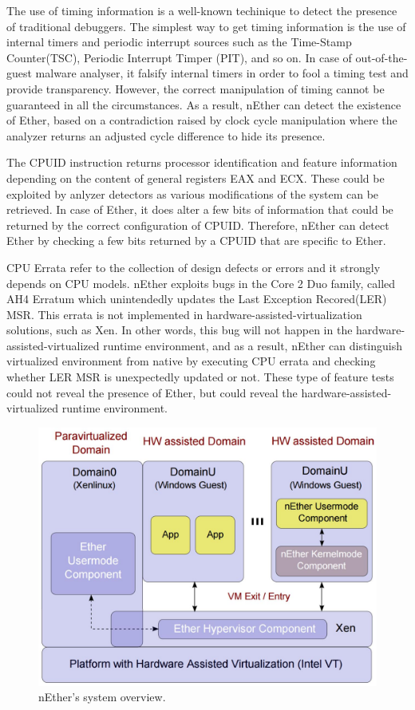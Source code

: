 The use of timing information is a well-known techinique to detect the presence 
of traditional debuggers. The simplest way to get timing information is 
the use of internal timers and periodic interrupt sources such as the Time-Stamp Counter(TSC), 
Periodic Interrupt Timper (PIT), and so on. In case of out-of-the-guest malware analyser, 
it falsify internal timers in order to fool a timing test and provide transparency. 
However, the correct manipulation of timing cannot be guaranteed in all the circumstances. 
As a result, nEther can detect the existence of Ether, based on a contradiction 
raised by clock cycle manipulation where the analyzer returns an adjusted cycle 
difference to hide its presence.

The CPUID instruction returns processor identification and feature information 
depending on the content of general registers EAX and ECX. These could be exploited 
by anlyzer detectors as various modifications of the system can be retrieved. 
In case of Ether, it does alter a few bits of information that could be returned 
by the correct configuration of CPUID. Therefore, nEther can detect Ether 
by checking a few bits returned by a CPUID that are specific to Ether.

CPU Errata refer to the collection of design defects or errors and 
it strongly depends on CPU models. nEther exploits bugs in the Core 2 Duo family, 
called AH4 Erratum which unintendedly updates the Last Exception Recored(LER) MSR. 
This errata is not implemented in hardware-assisted-virtualization solutions, such as Xen. 
In other words, this bug will not happen in the hardware-assisted-virtualized runtime environment, 
and as a result, nEther can distinguish virtualized environment from native 
by executing CPU errata and checking whether LER MSR is unexpectedly updated or not. 
These type of feature tests could not reveal the presence of Ether, 
but could reveal the hardware-assisted-virtualized runtime environment. 

\begin{figure}[!h]
	\centering
	\includegraphics[width=\linewidth]{figure/nether.png}
	\caption{nEther's system overview.}
	\label{fig:nether}
\end{figure}

